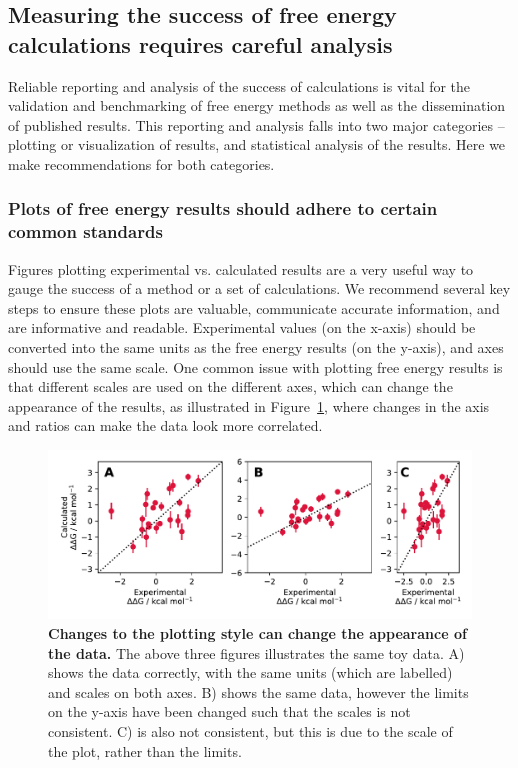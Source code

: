 \documentclass[9pt,bestpractices]{livecoms}
\begin{document}
\subsection{Measuring the success of free energy calculations requires careful analysis}

Reliable reporting and analysis of the success of calculations is vital for the validation and benchmarking of free energy methods as well as the dissemination of published results. This reporting and analysis falls into two major categories -- plotting or visualization of results, and statistical analysis of the results. Here we make recommendations for both categories.

\subsubsection{Plots of free energy results should adhere to certain common standards}
\label{sec:plotting_results}
Figures plotting experimental vs. calculated results are a very useful way to gauge the success of a method or a set of calculations. We recommend several key steps to ensure these plots are valuable, communicate accurate information, and are informative and readable. Experimental values (on the x-axis) should be converted into the same units as the free energy results (on the y-axis), and axes should use the same scale. One common issue with plotting free energy results is that different scales are used on the different axes, which can change the appearance of the results, as illustrated in Figure~\ref{fig:plotting-basics}, where changes in the axis and ratios can make the data look more correlated.

\begin{figure}
    \includegraphics[width=0.95\linewidth]{figures/reporting/plotting-basics.pdf}
    \caption{\textbf{Changes to the plotting style can change the appearance of the data.} The above three figures illustrates the same toy data. A) shows the data correctly, with the same units (which are labelled) and scales on both axes. B) shows the same data, however the limits on the y-axis have been changed such that the scales is not consistent. C) is also not consistent, but this is due to the scale of the plot, rather than the limits.}
    \label{fig:plotting-basics}
\end{figure}
\end{document}
